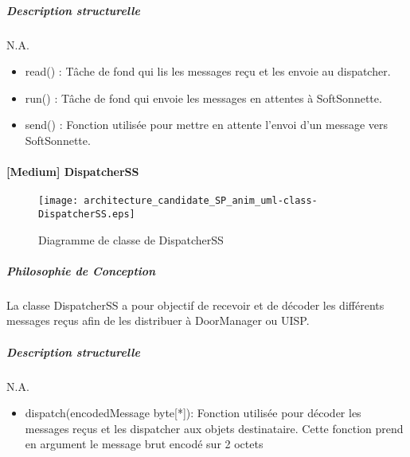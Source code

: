         \subparagraph{Description structurelle}%
        N.A.
        \begin{itemize}
            \item {read() : Tâche de fond qui lis les messages reçu et les envoie au dispatcher.}
            \item {run() : Tâche de fond qui envoie les messages en attentes à SoftSonnette.}
            \item {send() : Fonction utilisée pour mettre en attente l'envoi d'un message vers SoftSonnette.}            
        \end{itemize}
        
\newpage

    \paragraph{[Medium] DispatcherSS}%
    \begin{figure} [H]
        \centering
        \texttt{[image: architecture\_candidate\_SP\_anim\_uml-class-DispatcherSS.eps]}
        \caption{Diagramme de classe de DispatcherSS}
        \label{Classe-DispatcherSS}
    \end{figure}
    \subparagraph{Philosophie de Conception}%
    La classe DispatcherSS a pour objectif de recevoir et de décoder les différents messages reçus afin de les distribuer à DoorManager ou UISP.
    
    \subparagraph{Description structurelle}%
    N.A.
    \begin{itemize}
        \item {dispatch(encodedMessage byte[*]): Fonction utilisée pour décoder les messages reçus et les dispatcher aux objets destinataire.
        Cette fonction prend en argument le message brut encodé sur 2 octets}
    \end{itemize}
    \newpage
